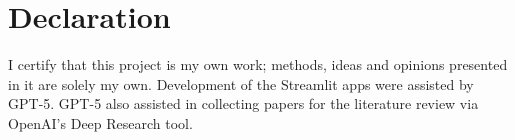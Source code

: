 
\chapter*{Declaration}

I certify that this project is my own work; methods, ideas and opinions presented in it are solely my own. Development of the Streamlit apps were assisted by GPT-5. GPT-5 also assisted in collecting papers for the literature review via OpenAI's Deep Research tool.
